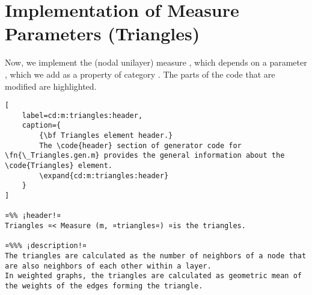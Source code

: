 \documentclass{tufte-handout}
\begin{document}
\clearpage
\section{Implementation of Measure Parameters (Triangles)}

Now, we implement the (nodal unilayer) measure , which depends on a parameter , which we add as a property of category .
The parts of the code that are modified are highlighted.

\begin{lstlisting}[
	label=cd:m:triangles:header,
	caption={
		{\bf Triangles element header.}
		The \code{header} section of generator code for \fn{\_Triangles.gen.m} provides the general information about the \code{Triangles} element.
		\expand{cd:m:triangles:header}
	}
]

¤%% ¡header!¤
Triangles ¤< Measure (m, ¤triangles¤) ¤is the triangles.

¤%%% ¡description!¤
The triangles are calculated as the number of neighbors of a node that are also neighbors of each other within a layer. 
In weighted graphs, the triangles are calculated as geometric mean of the weights of the edges forming the triangle.
\end{lstlisting}
\end{document}
